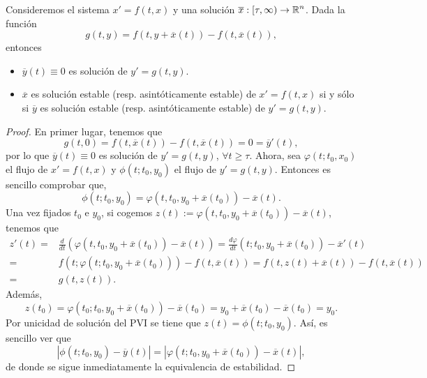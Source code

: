 \begin{lema}
Consideremos el sistema $\displaystyle x' = f\left(t,x\right) $ y una solución $\displaystyle \overline{x} : [\tau, \infty) \to \mathbb{R}^{n} $. Dada la función
\[g\left(t,y\right)=f\left(t,y + \overline{x}\left(t\right)\right)-f\left(t, \overline{x}\left(t\right)\right) ,\]
entonces
\begin{itemize}
\item $\displaystyle \overline{y}\left(t\right)\equiv 0 $ es solución de $\displaystyle y' = g\left(t,y\right) $. 
\item $\displaystyle \overline{x} $ es solución estable (resp. asintóticamente estable) de $\displaystyle x' = f\left(t,x\right) $ si y sólo si $\displaystyle \overline{y} $ es solución estable (resp. asintóticamente estable) de $\displaystyle y' = g\left(t,y\right) $. 
\end{itemize}
\end{lema}
\begin{proof}
En primer lugar, tenemos que 
\[g\left(t, 0\right)=f\left(t, \overline{x}\left(t\right)\right)-f\left(t, \overline{x}\left(t\right)\right)=0 = \overline{y}'\left(t\right) ,\]
por lo que $\displaystyle \overline{y}\left(t\right)\equiv 0 $ es solución de $\displaystyle y' = g\left(t,y\right) $, $\displaystyle \forall t \geq \tau $. Ahora, sea $\displaystyle \varphi\left(t; t_{0}, x_{0}\right) $ el flujo de $\displaystyle x' = f\left(t,x\right) $ y $\displaystyle \phi\left(t; t_{0}, y_{0}\right) $ el flujo de $\displaystyle y' = g\left(t,y\right) $. Entonces es sencillo comprobar que, 
\[\phi\left(t; t_{0}, y_{0}\right)=\varphi\left(t, t_{0}, y_{0} + \overline{x}\left(t_{0}\right)\right)-\overline{x}\left(t\right) .\]
Una vez fijados $\displaystyle t_{0} $ e $\displaystyle y_{0} $, si cogemos $\displaystyle z\left(t\right):=\varphi\left(t, t_{0}, y_{0} + \overline{x}\left(t_{0}\right)\right)-\overline{x}\left(t\right)  $, tenemos que 
\[
\begin{split}
	z'\left(t\right)= &\frac{d}{dt}\left(\varphi\left(t, t_{0}, y_{0} + \overline{x}\left(t_{0}\right)\right)-\overline{x}\left(t\right) \right)=\frac{d\varphi}{dt}\left(t; t_{0}, y_{0}+\overline{x}\left(t_{0}\right)\right)-\overline{x}'\left(t\right)\\
	= & f\left(t; \varphi\left(t; t_{0}, y_{0} + \overline{x}\left(t_{0}\right)\right)\right)-f\left(t, \overline{x}\left(t\right)\right) 
	=  f\left(t, z\left(t\right)+\overline{x}\left(t\right)\right)-f\left(t, \overline{x}\left(t\right)\right) \\
	= &  g\left(t, z\left(t\right)\right).
\end{split}
\]
Además, 
\[z\left(t_{0}\right)=\varphi\left(t_{0}; t_{0}, y_{0} + \overline{x}\left(t_{0}\right)\right)-\overline{x}\left(t_{0}\right)=y_{0} + \overline{x}\left(t_{0}\right)-\overline{x}\left(t_{0}\right)=y_{0} .\]
Por unicidad de solución del PVI se tiene que $\displaystyle z\left(t\right)=\phi\left(t; t_{0}, y_{0}\right) $. Así, es sencillo ver que 
\[ \left|\phi\left(t; t_{0}, y_{0}\right)-\overline{y}\left(t\right)\right|= \left|\varphi\left(t; t_{0}, y_{0} + \overline{x}\left(t_{0}\right)\right)-\overline{x}\left(t\right)\right| ,\]
de donde se sigue inmediatamente la equivalencia de estabilidad.
\end{proof}
